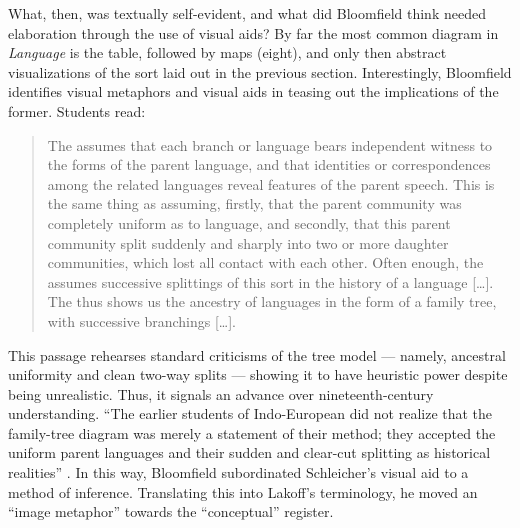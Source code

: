 \documentclass[output=paper]{langscibook}
\begin{document}
What, then, was textually self-evident, and what did Bloomfield think needed elaboration through the use of visual aids? By far the most common diagram in \emph{Language} is the table, followed by maps (eight), and only then abstract visualizations of the sort laid out in the previous section. Interestingly, Bloomfield identifies visual metaphors and visual aids in teasing out the implications of the former. Students read:

\begin{quotation}
The  assumes that each branch or language bears independent witness to the forms of the parent language, and that identities or correspondences among the related languages reveal features of the parent speech. This is the same thing as assuming, firstly, that the parent community was completely uniform as to language, and secondly, that this parent community split suddenly and sharply into two or more daughter communities, which lost all contact with each other. Often enough, the  assumes successive splittings of this sort in the history of a language […]. The  thus shows us the ancestry of languages in the form of a family tree, with successive branchings […]. \citep[311]{Bloomfield1933}
\end{quotation}

This passage rehearses standard criticisms of the tree model — namely, ancestral uniformity and clean two-way splits — showing it to have heuristic power despite being unrealistic. Thus, it signals an advance over nineteenth-century understanding. ``The earlier students of Indo-European did not realize that the family-tree diagram was merely a statement of their method; they accepted the uniform parent languages and their sudden and clear-cut splitting as historical realities'' \citep[311]{Bloomfield1933}. In this way, Bloomfield subordinated Schleicher's visual aid to a method of inference. Translating this into Lakoff's terminology, he moved an ``image metaphor'' towards the ``conceptual'' register.
\end{document}
